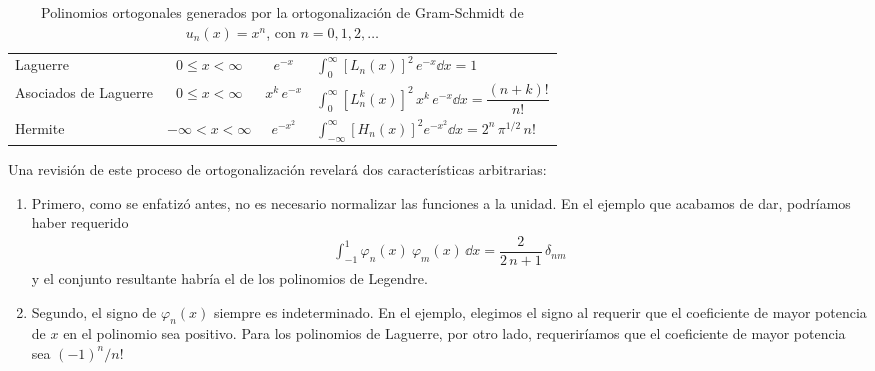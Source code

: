 \begin{landscape}
\begin{table}[H]
{\begin{tabular}{p{5cm} c c p{10cm}}
Laguerre & $0 \leq x < \infty $ & $e^{-x}$ & $\displaystyle \int_{0}^{\infty} \left[ L_{n} (x) \right]^{2} \, e^{-x} \dd{x} =  1 $ \\
Asociados de Laguerre & $0 \leq x < \infty $ & $x^{k} \, e^{-x}$ & $\displaystyle \int_{0}^{\infty} \left[ L_{n}^{k} (x) \right]^{2} \, x^{k} \, e^{-x} \dd{x} = \dfrac{(n + k)!}{n!} $ \\
Hermite & $- \infty < x < \infty $ & $e^{-x^{2}}$ & $\displaystyle \int_{-\infty}^{\infty} \left[ H_{n} (x) \right]^{2} e^{-x^{2}} \dd{x} = 2^{n} \, \pi^{1/2} \, n! $
\end{tabular}}
\caption{Polinomios ortogonales generados por la ortogonalización de Gram-Schmidt de $u_{n}(x)= x^{n}$, con $n=0,1,2,\ldots$}
\label{tabla:tabla_03}
\end{table}
\end{landscape}
Una revisión de este proceso de ortogonalización revelará dos características arbitrarias:
\begin{enumerate}
\item Primero, como se enfatizó antes, no es necesario normalizar las funciones a la unidad. En el ejemplo que acabamos de dar, podríamos haber requerido
\begin{align}
\int_{-1}^{1} \varphi_{n} (x) \: \varphi_{m} (x) \, \dd{x} = \dfrac{2}{2 \, n +1} \, \delta_{nm}
\label{eq:ecuacion_10_61}
\end{align}
y el conjunto resultante habría el de los polinomios de Legendre.
\item Segundo, el signo de $\varphi_{n} (x)$ siempre es indeterminado. En el ejemplo, elegimos el signo al requerir que el coeficiente de mayor potencia de $x$ en el polinomio sea positivo. Para los polinomios de Laguerre, por otro lado, requeriríamos que el coeficiente de mayor potencia sea $(-1)^{n}/n!$
\end{enumerate}
